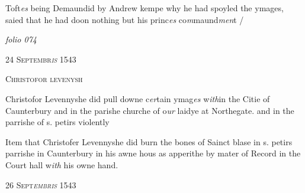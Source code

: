 \documentclass[12pt, a4paper]{book}
\begin{document}
	
		\ifthenelse{\isodd{\thepage}}
		{\reversemarginpar}
		{\normalmarginpar}
		Toft\textit{es} being Demaundid by Andrew kempe
 why he had spoyled the ymages, saied that
 he had doon nothing but his princ\textit{es} co\textit{m}maund\textit{men}t /


            
            
\dotfill
					

\textit{folio 074}


            
               
				\begin{center} \begin{large} {\scshape 
                  24 Septembr\textit{is} 1543
               } \end{large} \end{center}
			
               
                  
				\begin{center}  {\scshape Christofor levenysh}  \end{center}
			
 
               	
               		
			
               		
		\ifthenelse{\isodd{\thepage}}
		{\reversemarginpar}
		{\normalmarginpar}
		Christofor Levennyshe did pull downe
               			c\textit{er}tain ymag\textit{es} w\textit{ith}in the Citie of Caunterbury
  and in the parishe churche of o\textit{ur} laidye at
 Northegate. and in the parrishe of s. petirs
 violently
               	
               	
               		
			
               		
		\ifthenelse{\isodd{\thepage}}
		{\reversemarginpar}
		{\normalmarginpar}
		Item that Christofer Levennyshe did burn
 the bones of Sainct blase in s. petirs parrishe
 	in Caunterbury in his awne hous as apperithe
 by mater of Record in the Court hall w\textit{ith} his
 owne hand.
 

            
            
               
				\begin{center} \begin{large} {\scshape 
                  26 Sept\textit{embris} 1543
               } \end{large} \end{center}
			
\end{document}
